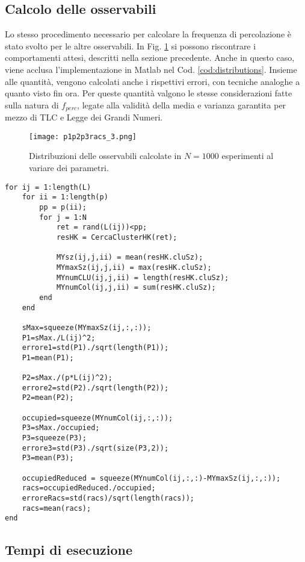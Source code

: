 \subsection*{Calcolo delle osservabili}
Lo stesso procedimento necessario per calcolare la frequenza di percolazione è stato svolto per 
le altre osservabili. In Fig. \ref{fig:distributions} si possono riscontrare i comportamenti 
attesi, descritti nella sezione precedente.
Anche in questo caso, viene acclusa l'implementazione in Matlab nel Cod. \ref{cod:distributions}.
Insieme alle quantità, vengono calcolati anche i rispettivi errori, con tecniche analoghe a quanto visto 
fin ora. Per queste quantità valgono le stesse considerazioni fatte sulla natura di $f_{perc}$,
legate alla validità della media e varianza garantita per mezzo di 
TLC e Legge dei Grandi Numeri.
\begin{figure}[ht]
    \texttt{[image: p1p2p3racs\_3.png]}
    \caption{Distribuzioni delle osservabili calcolate in $N=1000$ esperimenti al variare dei parametri.}
    \label{fig:distributions}
\end{figure}
\begin{lstlisting}[caption={Porzione di codice per il calcolo delle osservabili.},label={cod:distributions}]
for ij = 1:length(L)
    for ii = 1:length(p)
        pp = p(ii);
        for j = 1:N
            ret = rand(L(ij))<pp;
            resHK = CercaClusterHK(ret);

            MYsz(ij,j,ii) = mean(resHK.cluSz);
            MYmaxSz(ij,j,ii) = max(resHK.cluSz);
            MYnumCLU(ij,j,ii) = length(resHK.cluSz);
            MYnumCol(ij,j,ii) = sum(resHK.cluSz);
        end
    end
   
    sMax=squeeze(MYmaxSz(ij,:,:));
    P1=sMax./L(ij)^2;
    errore1=std(P1)./sqrt(length(P1));
    P1=mean(P1);

    P2=sMax./(p*L(ij)^2);
    errore2=std(P2)./sqrt(length(P2));
    P2=mean(P2);

    occupied=squeeze(MYnumCol(ij,:,:));
    P3=sMax./occupied;
    P3=squeeze(P3);
    errore3=std(P3)./sqrt(size(P3,2));
    P3=mean(P3);

    occupiedReduced = squeeze(MYnumCol(ij,:,:)-MYmaxSz(ij,:,:));
    racs=occupiedReduced./occupied;
    erroreRacs=std(racs)/sqrt(length(racs));
    racs=mean(racs);
end
\end{lstlisting}

\subsection*{Tempi di esecuzione}